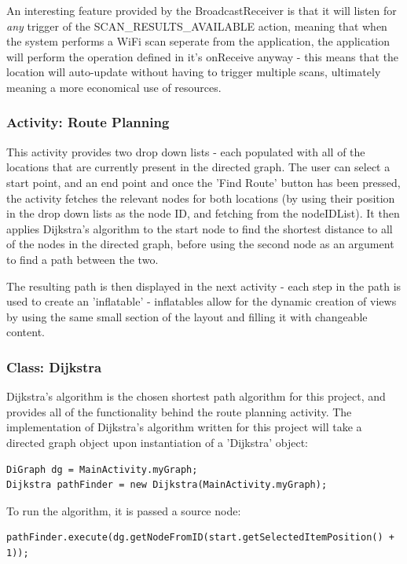 \documentclass[11pt]{informatics-report}
\begin{document}
An interesting feature provided by the BroadcastReceiver is that it will listen for \textit{any} trigger of the SCAN\_RESULTS\_AVAILABLE action, meaning that when the system performs a WiFi scan seperate from the application, the application will perform the operation defined in it's onReceive anyway - this means that the location will auto-update without having to trigger multiple scans, ultimately meaning a more economical use of resources.

\subsubsection{Activity: Route Planning}

This activity provides two drop down lists - each populated with all of the locations that are currently present in the directed graph. The user can select a start point, and an end point and once the 'Find Route' button has been pressed, the activity fetches the relevant nodes for both locations (by using their position in the drop down lists as the node ID, and fetching from the nodeIDList). It then applies Dijkstra's algorithm to the start node to find the shortest distance to all of the nodes in the directed graph, before using the second node as an argument to find a path between the two.

The resulting path is then displayed in the next activity - each step in the path is used to create an 'inflatable' - inflatables allow for the dynamic creation of views by using the same small section of the layout and filling it with changeable content.

\subsubsection{Class: Dijkstra}

Dijkstra's algorithm is the chosen shortest path algorithm for this project, and provides all of the functionality behind the route planning activity. The implementation of Dijkstra's algorithm written for this project will take a directed graph object upon instantiation of a 'Dijkstra' object:

\begin{verbatim}
DiGraph dg = MainActivity.myGraph;
Dijkstra pathFinder = new Dijkstra(MainActivity.myGraph);
\end{verbatim}

To run the algorithm, it is passed a source node:

\begin{verbatim}
pathFinder.execute(dg.getNodeFromID(start.getSelectedItemPosition() + 1));
\end{verbatim}
\end{document}
